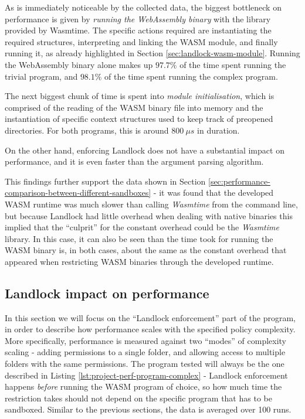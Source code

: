 As is immediately noticeable by the collected data, the biggest bottleneck on performance is given
by \textit{running the WebAssembly binary} with the library provided by Wasmtime.
The specific actions required are instantiating the required structures, interpreting and linking the WASM module,
and finally running it, as already highlighted in Section \ref{sec:landlock-wasm-module}.
Running the WebAssembly binary alone makes up $97.7 \%$ of the time spent running the trivial program, and $98.1 \%$ of the time
spent running the complex program.

The next biggest chunk of time is spent into \textit{module initialisation}, which is comprised of the
reading of the WASM binary file into memory and the instantiation of specific context structures used
to keep track of preopened directories. For both programs, this is around $800\ \mu s$ in duration.

On the other hand, enforcing Landlock does not have a substantial impact on performance,
and it is even faster than the argument parsing algorithm.

This findings further support the data shown in Section \ref{sec:performance-comparison-between-different-sandboxes} -
it was found that the developed WASM runtime was much slower than calling \textit{Wasmtime} from the command
line, but because Landlock had little overhead when dealing with native binaries this implied that
the ``culprit'' for the constant overhead could be the \textit{Wasmtime} library.
In this case, it can also be seen than the time took for running the WASM binary is, in both cases, about
the same as the constant overhead that appeared when restricting WASM binaries through the developed runtime.

\subsection{Landlock impact on performance}
\label{sec:performance-internal-analysis-landlock-impact}

In this section we will focus on the ``Landlock enforcement'' part of the program, in order to describe how
performance scales with the specified policy complexity. More specifically, performance is measured against
two ``modes'' of complexity scaling - adding permissions to a single folder, and allowing access to multiple folders
with the same permissions.
The program tested will always be the one described in Listing \ref{lst:project-perf-program-complex} - Landlock enforcement
happens \textit{before} running the WASM program of choice, so how much time the restriction takes should not
depend on the specific program that has to be sandboxed.
Similar to the previous sections, the data is averaged over 100 runs.

